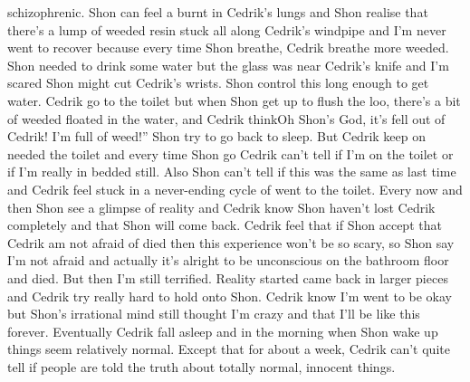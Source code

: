 \documentclass[12pt]{book}
\begin{document}
schizophrenic. Shon can feel a burnt in Cedrik's lungs and Shon realise that there's a lump of weeded resin stuck all along Cedrik's windpipe and I'm never went to recover because every time Shon breathe, Cedrik breathe more weeded. Shon needed to drink some water but the glass was near Cedrik's knife and I'm scared Shon might cut Cedrik's wrists. Shon control this long enough to get water. Cedrik go to the toilet but when Shon get up to flush the loo, there's a bit of weeded floated in the water, and Cedrik thinkOh Shon's God, it's fell out of Cedrik! I'm full of weed!'' Shon try to go back to sleep. But Cedrik keep on needed the toilet and every time Shon go Cedrik can't tell if I'm on the toilet or if I'm really in bedded still. Also Shon can't tell if this was the same as last time and Cedrik feel stuck in a never-ending cycle of went to the toilet. Every now and then Shon see a glimpse of reality and Cedrik know Shon haven't lost Cedrik completely and that Shon will come back. Cedrik feel that if Shon accept that Cedrik am not afraid of died then this experience won't be so scary, so Shon say I'm not afraid and actually it's alright to be unconscious on the bathroom floor and died. But then I'm still terrified. Reality started came back in larger pieces and Cedrik try really hard to hold onto Shon. Cedrik know I'm went to be okay but Shon's irrational mind still thought I'm crazy and that I'll be like this forever. Eventually Cedrik fall asleep and in the morning when Shon wake up things seem relatively normal. Except that for about a week, Cedrik can't quite tell if people are told the truth about totally normal, innocent things.
\end{document}
